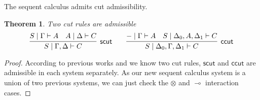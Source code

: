 \documentclass[submission,copyright,creativecommons]{eptcs}
\newtheorem{theorem}{Theorem}[section]
\theoremstyle{definition}
\newcommand{\ot}{\otimes}
\newcommand{\lolli}{\multimap}
\begin{document}
The sequent calculus admits cut admissibility.
\begin{theorem}
Two cut rules are admissible %
  \begin{displaymath}
    \infer[\mathsf{scut}]{S \mid \Gamma , \Delta \vdash C}{
      S \mid \Gamma \vdash A
      &
      A \mid \Delta \vdash C
    }
    \qquad
    \infer[\mathsf{ccut}]{S \mid \Delta_0 , \Gamma , \Delta_1 \vdash C}{
      - \mid \Gamma \vdash A
      &
      S \mid \Delta_0 , A , \Delta_1 \vdash C
    }
  \end{displaymath}
\end{theorem}
\begin{proof}
  According to previous works \cite{uustalu:sequent:2021} and \cite{uustalu:deductive:nodate} we know two cut rules, $\mathsf{scut}$ and $\mathsf{ccut}$ are admissible in each system separately.
  As our new sequent calculus system is a union of two previous systems, we can just check the $\ot$ and $\lolli$ interaction cases.


\end{proof}
\end{document}
